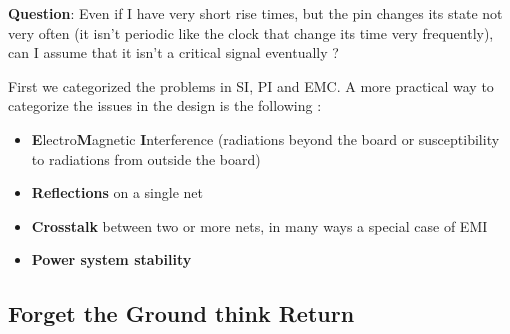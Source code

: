 \documentclass[final]{cubedoc}
\begin{document}
	\textbf{Question}: Even if I have very short rise times, but the pin changes its state not very often (it isn't periodic like the clock that change its time very frequently), can I assume that it isn't a critical signal eventually \cite{instruments1999pcb}?
	
	First we categorized the problems in SI, PI and EMC. A more practical way to categorize the issues in the design is the following \cite{brooks2003signal}:
	
	
	
	\begin{itemize}
		\item \textbf{E}lectro\textbf{M}agnetic \textbf{I}nterference (radiations beyond the board or susceptibility to radiations from outside the board)
		\item \textbf{Reflections} on a single net
		\item \textbf{Crosstalk} between two or more nets, in many ways a special case of EMI
		\item \textbf{Power system stability} 
	\end{itemize}
	
	\subsection{Forget the Ground think Return}
	
	
\end{document}
